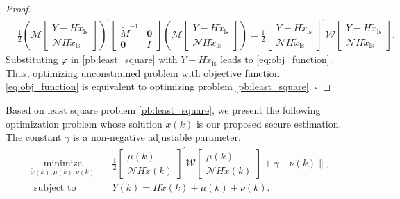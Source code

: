\documentclass[12pt]{article}  %
\newcommand{\Mc}{{\mathcal{M}}}
\newcommand{\Nc}{{\mathcal{N}}}
\newcommand{\Wc}{{\mathcal{W}}}
\newcommand{\ls}{\text{ls}}
\newtheorem*{proof}{\textbf{Proof}}
\begin{document}
\begin{proof}
\begin{align}
	&\frac{1}{2}
	\left(\Mc
	\begin{bmatrix}
	{Y} - H\tilde{x}_{\ls} \\
	\Nc H \tilde{x}_{\ls}
	\end{bmatrix}
	\right)^{'}
	\begin{bmatrix}
	\tilde{M}^{-1} & \mathbf{0} \\
	\mathbf{0} &  I
	\end{bmatrix}
	\left(\Mc
	\begin{bmatrix}
	{Y} - H\tilde{x}_{\ls} \\
	\Nc H \tilde{x}_{\ls}
	\end{bmatrix}
	\right) 
	=\frac{1}{2}
	\begin{bmatrix}
	{Y} - H\tilde{x}_{\ls} \\
	\Nc H \tilde{x}_{\ls}
	\end{bmatrix}^{'}
	\Wc
	\begin{bmatrix}
	{Y} - H\tilde{x}_{\ls} \\
	\Nc H \tilde{x}_{\ls}
	\end{bmatrix} . 
	\end{align}
	Substituting $\varphi$ in \eqref{pb:least_square} with ${Y}-H\tilde{x}_{\ls}$ leads to \eqref{eq:obj_function}. Thus, optimizing unconstrained problem with objective function  \eqref{eq:obj_function} is equivalent to optimizing problem \eqref{pb:least_square}.  $\square$ 
	\end{proof}

Based on least square problem \eqref{pb:least_square}, we present the following optimization problem whose solution $\tilde{x}(k)$ is our proposed secure estimation. The constant $\gamma$ is a non-negative adjustable parameter.
\begin{subequations}\label{pb:resilient_LASSO}
	\begin{align}
	\underset{{\tilde{x}}(k), \mu(k),\nu(k)}{\text{minimize}}&\quad \frac{1}{2} 
	\begin{bmatrix}
	\mu(k) \\
	\Nc H \tilde{x}(k)
	\end{bmatrix}^{'} \Wc
	\begin{bmatrix}
	\mu(k) \\
	\Nc H \tilde{x}(k)
	\end{bmatrix} + \gamma\left\|\nu(k)\right\|_1  \\
	\text { subject to }&\quad
	{Y} (k)= H \tilde{x}(k)+\mu(k)+\nu(k) .  
	\end{align}
\end{subequations}
\end{document}
